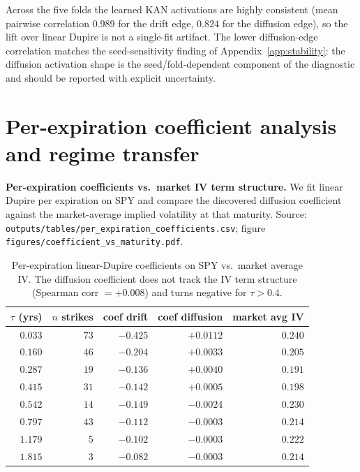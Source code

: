 \documentclass[10pt]{article}
\begin{document}
Across the five folds the learned KAN activations are highly consistent (mean pairwise correlation $0.989$ for the drift edge, $0.824$ for the diffusion edge), so the lift over linear Dupire is not a single-fit artifact. The lower diffusion-edge correlation matches the seed-sensitivity finding of Appendix~\ref{app:stability}: the diffusion activation shape is the seed/fold-dependent component of the diagnostic and should be reported with explicit uncertainty.

\section{Per-expiration coefficient analysis and regime transfer}\label{app:per-exp}

\textbf{Per-expiration coefficients vs.\ market IV term structure.} We fit linear Dupire per expiration on SPY and compare the discovered diffusion coefficient against the market-average implied volatility at that maturity. Source: \texttt{outputs/tables/per\_expiration\_coefficients.csv}; figure \texttt{figures/coefficient\_vs\_maturity.pdf}.

\begin{table}[h]
\centering\footnotesize
\caption{Per-expiration linear-Dupire coefficients on SPY vs.\ market average IV. The diffusion coefficient does not track the IV term structure (Spearman corr $= +0.008$) and turns negative for $\tau > 0.4$.}
\label{tab:per-exp}
\begin{tabular}{rrrrr}
\toprule
$\tau$ (yrs) & $n$ strikes & coef drift & coef diffusion & market avg IV \\
\midrule
$0.033$ & $73$ & $-0.425$ & $+0.0112$  & $0.240$ \\
$0.160$ & $46$ & $-0.204$ & $+0.0033$  & $0.205$ \\
$0.287$ & $19$ & $-0.136$ & $+0.0040$  & $0.191$ \\
$0.415$ & $31$ & $-0.142$ & $+0.0005$  & $0.198$ \\
$0.542$ & $14$ & $-0.149$ & $\mathbf{-0.0024}$ & $0.230$ \\
$0.797$ & $43$ & $-0.112$ & $\mathbf{-0.0003}$ & $0.214$ \\
$1.179$ & $5$  & $-0.102$ & $\mathbf{-0.0003}$ & $0.222$ \\
$1.815$ & $3$  & $-0.082$ & $\mathbf{-0.0003}$ & $0.214$ \\
\bottomrule
\end{tabular}
\end{table}
\end{document}

